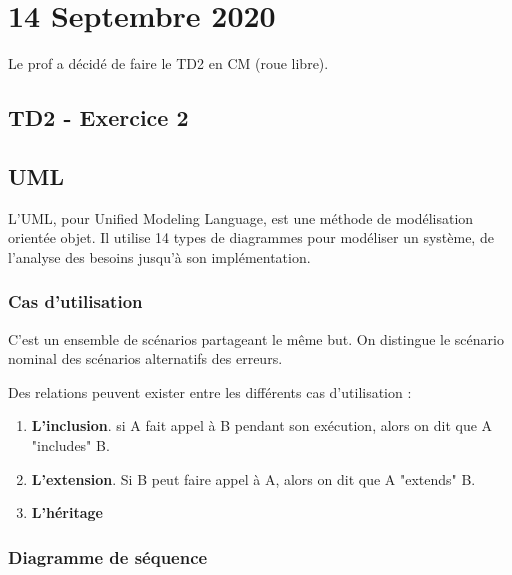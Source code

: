 \section{14 Septembre 2020}

Le prof a décidé de faire le TD2 en CM (roue libre).

\subsection{TD2 - Exercice 2}

\subsection{UML}

L'UML, pour Unified Modeling Language, est une méthode de modélisation orientée objet. Il utilise 14 types de diagrammes pour modéliser un système, de l'analyse des besoins jusqu'à son implémentation.

\subsubsection{Cas d'utilisation}

C'est un ensemble de scénarios partageant le même but. On distingue le scénario nominal des scénarios alternatifs des erreurs.

Des relations peuvent exister entre les différents cas d'utilisation :

\begin{enumerate}
	\item \textbf{L'inclusion}. si A fait appel à B pendant son exécution, alors on dit que A "includes" B.
	\item \textbf{L'extension}. Si B peut faire appel à A, alors on dit que A "extends" B.
	\item \textbf{L'héritage}
\end{enumerate}

\subsubsection{Diagramme de séquence}

